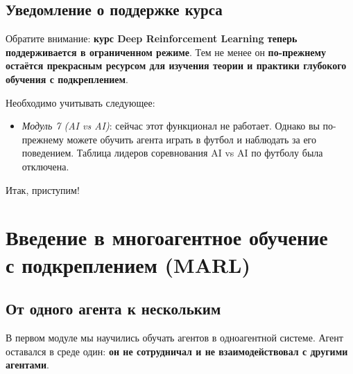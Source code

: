 \documentclass[11pt,a4paper]{article}
\begin{document}
\subsection{Уведомление о поддержке курса}\label{course-maintenance-notice-maintenance-notice}

Обратите внимание: \textbf{курс Deep Reinforcement Learning теперь поддерживается в ограниченном режиме}. Тем не менее он \textbf{по-прежнему остаётся прекрасным ресурсом для изучения теории и практики глубокого обучения с подкреплением}.

Необходимо учитывать следующее:

\begin{itemize}
\tightlist
\item
  \emph{Модуль 7 (AI vs AI)}: сейчас этот функционал не работает. Однако вы по-прежнему можете обучить агента играть в футбол и наблюдать за его поведением. Таблица лидеров соревнования AI vs AI по футболу была отключена.
\end{itemize}


Итак, приступим!

\section[Введение в многоагентное обучение с подкреплением (MARL)]{Введение в многоагентное обучение\texorpdfstring{\\}{ } с подкреплением (MARL)}\label{an-introduction-to-multi-agents-reinforcement-learning-marl}

\subsection{От одного агента к нескольким}\label{from-single-agent-to-multiple-agents}

В первом модуле мы научились обучать агентов в одноагентной системе. Агент оставался в среде один: \textbf{он не сотрудничал и не взаимодействовал с другими агентами}.

\end{document}
